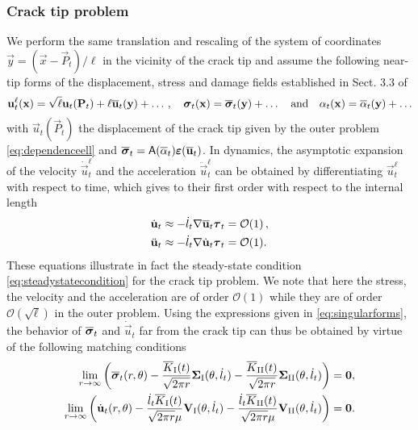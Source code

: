 \subsubsection{Crack tip problem}
We perform the same translation and rescaling of the system of coordinates $\vec{y}=(\vec{x}-\vec{P}_t)/\ell$ in the vicinity of the crack tip and assume the following near-tip forms of the displacement, stress and damage fields established in Sect. 3.3 of \cite{SicsicMarigo:2013}
\[
\vec{u}_t^\ell(\vec{x})=\sqrt{\ell}\vec{u}_t(\vec{P}_t)+\ell\overline{\vec{u}}_t(\vec{y})+\ldots\,,\quad\sig_t(\vec{x})=\overline{\sig}_t(\vec{y})+\ldots\quad\text{and}\quad\alpha_t(\vec{x})=\overline{\alpha}_t(\vec{y})+\ldots
\]
with $\vec{u}_t(\vec{P}_t)$ the displacement of the crack tip given by the outer problem \eqref{eq:dependenceell} and $\overline{\sig}_t=\tens{A}(\overline{\alpha}_t)\eps(\overline{\vec{u}}_t)$. In dynamics, the asymptotic expansion of the velocity $\dot{\vec{u}}_t^\ell$ and the acceleration $\ddot{\vec{u}}_t^\ell$ can be obtained by differentiating $\vec{u}_t^\ell$ with respect to time, which gives to their first order with respect to the internal length
\begin{equation} \label{eq:asymsteadycondition}
\begin{aligned}
\dot{\vec{u}}_t &\approx -\dot{l}_t\nabla\overline{\vec{u}}_t\vtau_t=\mathcal{O}(1)\,, \\
\ddot{\vec{u}}_t &\approx -\dot{l}_t\nabla\dot{\vec{u}}_t\vtau_t=\mathcal{O}(1).
\end{aligned}
\end{equation}
These equations illustrate in fact the steady-state condition \eqref{eq:steadystatecondition} for the crack tip problem. We note that here the stress, the velocity and the acceleration are of order $\mathcal{O}(1)$ while they are of order $\mathcal{O}(\sqrt{\ell})$ in the outer problem. Using the expressions given in \eqref{eq:singularforms}, the behavior of $\overline{\sig}_t$ and $\dot{\vec{u}}_t$ far from the crack tip can thus be obtained by virtue of the following matching conditions
\begin{equation} \label{eq:asymgradu}
\begin{aligned}
\lim_{r\to\infty}\left(\overline{\sig}_t(r,\theta)-\frac{\overline{K}_\RNN{1}(t)}{\sqrt{2\pi r}}\vec{\Sigma}_\RNN{1}(\theta,\dot{l}_t)-\frac{\overline{K}_\RNN{2}(t)}{\sqrt{2\pi r}}\vec{\Sigma}_\RNN{2}(\theta,\dot{l}_t)\right)=\vec{0}, \\
\lim_{r\to\infty}\left(\dot{\vec{u}}_t(r,\theta)-\frac{\dot{l}_t\overline{K}_\RNN{1}(t)}{\sqrt{2\pi r}\mu}\vec{V}_\RNN{1}(\theta,\dot{l}_t)-\frac{\dot{l}_t\overline{K}_\RNN{2}(t)}{\sqrt{2\pi r}\mu}\vec{V}_\RNN{2}(\theta,\dot{l}_t)\right)=\vec{0}.
\end{aligned}
\end{equation}
